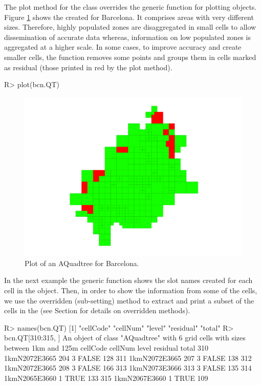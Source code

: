 The plot method for the  class overrides the generic function for plotting  objects. Figure \ref{fig:Fig6} shows the  created for Barcelona. It comprises areas with very different sizes. Therefore, highly populated zones are disaggregated in small cells to allow dissemination of accurate data whereas, information on low populated zones is aggregated at a higher scale. In some cases, to improve accuracy and create smaller cells, the function removes some points and groups them in cells marked as residual (those printed in red by the plot method). 
%
\begin{example*}
R> plot(bcn.QT)
\end{example*}
%

\begin{figure}[ht!]
\centering
\includegraphics[width=0.6\linewidth]{images/Fig6}
\caption{\label{fig:Fig6} Plot of an AQuadtree for Barcelona.}
\end{figure}

In the next example the  generic function shows the slot names created for each cell in the  object. Then, in order to show the information from some of the  cells, we use the overridden \code{[} (sub-setting) method to extract and print a subset of the cells in the  (see Section  for details on overridden methods).
%
\begin{example*}
R> names(bcn.QT)
[1] "cellCode"  "cellNum"  "level"  "residual"  "total" 
R> bcn.QT[310:315, ]
An object of class "AQuadtree" with 6 grid cells with sizes between 1km and
125m 
         cellCode cellNum level residual total
310 1kmN2072E3665     204     3    FALSE   128
311 1kmN2072E3665     207     3    FALSE   138
312 1kmN2072E3665     208     3    FALSE   166
313 1kmN2073E3666     313     3    FALSE   135
314 1kmN2065E3660             1     TRUE   133
315 1kmN2067E3660             1     TRUE   109
\end{example*}
%

